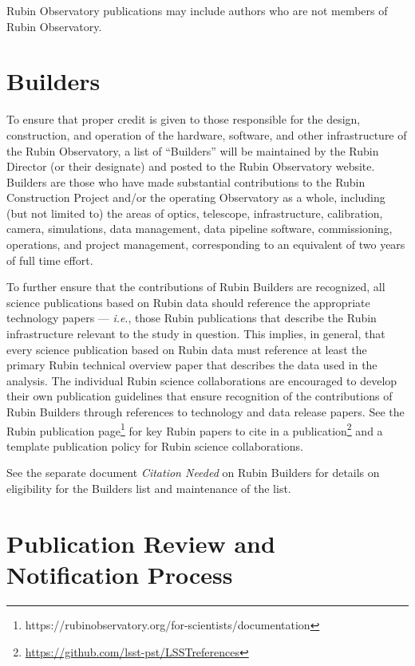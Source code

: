 Rubin Observatory publications may include authors who are not members of Rubin Observatory.

\section{Builders}\label{builders}

To ensure that proper credit is given to those responsible for the design, construction, and operation of the hardware, software, and other infrastructure of the Rubin Observatory, a list of ``Builders'' will be maintained by the Rubin  Director (or their designate) and posted to the Rubin Observatory website.
Builders are those who have made substantial contributions to the Rubin Construction Project and/or the operating Observatory as a whole, including (but not limited to) the areas of optics, telescope, infrastructure, calibration, camera, simulations, data management, data pipeline software, commissioning, operations, and project management, corresponding to an equivalent of two years of full time effort.

To further ensure that the contributions of Rubin Builders are recognized, all science publications based on Rubin data should reference the appropriate technology papers --- \emph{i.e}., those Rubin publications that describe the Rubin infrastructure relevant to the study in question.
This implies, in general, that every science publication based on Rubin data must reference at least the primary Rubin technical overview paper that describes the data used in the analysis.
The individual Rubin science collaborations are encouraged to develop their own publication guidelines that ensure recognition of the contributions of Rubin Builders through references to technology and data release papers.
See the Rubin publication page\footnote{https://rubinobservatory.org/for-scientists/documentation} for key Rubin papers to cite in a publication\footnote{\url{https://github.com/lsst-pst/LSSTreferences}} and a template publication policy for Rubin science collaborations.

See the separate document \emph{Citation Needed} on Rubin Builders for details on eligibility for the Builders list and maintenance of the list.

\section{Publication Review and Notification Process}\label{publication-review-and-notification-process}

